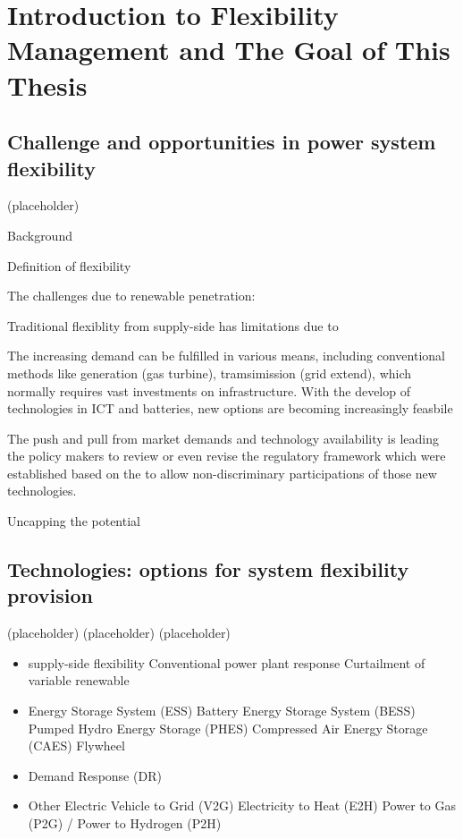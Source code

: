 \chapter{Introduction to Flexibility Management and The Goal of This Thesis}
\label{ch:introduction}
%
\section{Challenge and opportunities in power system flexibility}
\newpage
(placeholder)
\newpage

Background

Definition of flexibility

The challenges due to renewable penetration:

Traditional flexiblity from supply-side has limitations due to %

The increasing demand can be fulfilled in various means, including conventional methods like generation (gas turbine), tramsimission (grid extend), which normally requires vast investments on infrastructure. With the develop of technologies in ICT and batteries, new options are becoming increasingly feasbile %

The push and pull from market demands and technology availability is leading the policy makers to review or even revise the regulatory framework which were established based on the  to allow non-discriminary participations of those new technologies. %

Uncapping the potential
\section{Technologies: options for system flexibility provision}
(placeholder)
\newpage
(placeholder)
\newpage
(placeholder)
\newpage

\begin{itemize}
	\item supply-side flexibility
	\subitem Conventional power plant response
	\subitem Curtailment of variable renewable
	\item Energy Storage System (ESS)
	\subitem Battery Energy Storage System (BESS)
	\subitem Pumped Hydro Energy Storage (PHES)
	\subitem Compressed Air Energy Storage (CAES)
	\subitem Flywheel
	\item Demand Response (DR)
	\item Other
	\subitem Electric Vehicle to Grid (V2G)
	\subitem Electricity to Heat (E2H)
	\subitem Power to Gas (P2G) / Power to Hydrogen (P2H)
\end{itemize}
